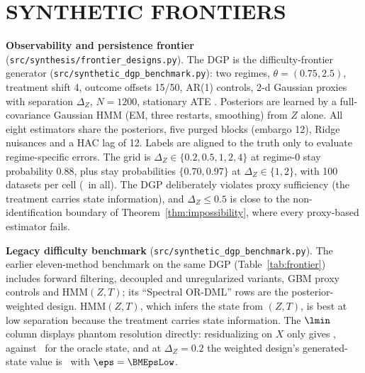 \section{SYNTHETIC FRONTIERS}
\label{app:frontiers}
\textbf{Observability and persistence frontier} (\texttt{src/synthesis/frontier\_designs.py}). The DGP is the difficulty-frontier generator (\texttt{src/synthetic\_dgp\_benchmark.py}): two regimes, $\theta=(0.75,2.5)$, treatment shift 4, outcome offsets 15/50, AR(1) controls, 2-d Gaussian proxies with separation $\Delta_Z$, $N=1200$, stationary ATE \FDTrueATE. Posteriors are learned by a full-covariance Gaussian HMM (EM, three restarts, smoothing) from $Z$ alone. All eight estimators share the posteriors, five purged blocks (embargo 12), Ridge nuisances and a HAC lag of 12. Labels are aligned to the truth only to evaluate regime-specific errors. The grid is $\Delta_Z\in\{0.2,0.5,1,2,4\}$ at regime-0 stay probability 0.88, plus stay probabilities $\{0.70,0.97\}$ at $\Delta_Z\in\{1,2\}$, with 100 datasets per cell (\FDNRuns\ in all). The DGP deliberately violates proxy sufficiency (the treatment carries state information), and $\Delta_Z\le0.5$ is close to the non-identification boundary of Theorem~\ref{thm:impossibility}, where every proxy-based estimator fails.
\begin{table}[h]\centering\scriptsize\setlength{\tabcolsep}{3pt}
\caption{Observability $\times$ persistence frontier, all estimators (\texttt{reports/synthesis/}\allowbreak\texttt{frontier\_designs\_summary.csv}). Coverage: nominal 95\% intervals for the sample ATE. $\|\hat\bth-\bth^*\|$: median over datasets. $\lmin$: generated-state Gram matrix (median).}\label{tab:fd}

\end{table}
\begin{table}[h]\centering\footnotesize
\caption{Persistence: mean absolute ATE bias by regime-0 stay probability $p_{00}$ (\texttt{reports/synthesis/frontier\_designs\_summary.csv}).}\label{tab:fc}

\end{table}
\textbf{Legacy difficulty benchmark} (\texttt{src/synthetic\_dgp\_benchmark.py}). The earlier eleven-method benchmark on the same DGP (Table~\ref{tab:frontier}) includes forward filtering, decoupled and unregularized variants, GBM proxy controls and HMM$(Z,T)$; its ``Spectral OR-DML'' rows are the posterior-weighted design. HMM$(Z,T)$, which infers the state from $(Z,T)$, is best at low separation because the treatment carries state information. The $\lmin$ column displays phantom resolution directly: residualizing on $X$ only gives \BMLamStd, against \BMLamOracle\ for the oracle state, and at $\Delta_Z=0.2$ the weighted design's generated-state value is \BMLamSoftLow\ with $\eps=\BMEpsLow$.
